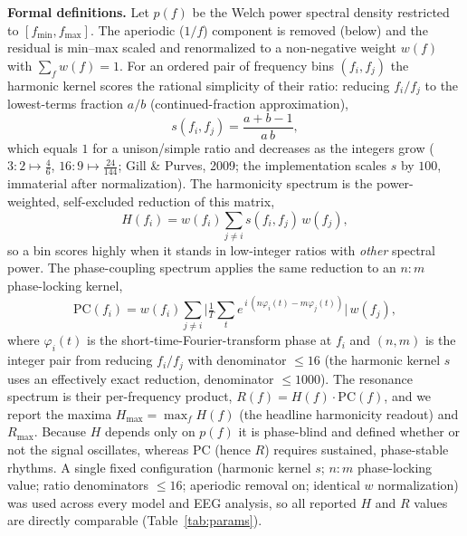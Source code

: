 \documentclass[11pt]{article}
\begin{document}
\textbf{Formal definitions.} Let $p(f)$ be the Welch power spectral density restricted to $[f_{\min},f_{\max}]$. The aperiodic ($1/f$) component is removed (below) and the residual is min--max scaled and renormalized to a non-negative weight $w(f)$ with $\sum_f w(f)=1$. For an ordered pair of frequency bins $(f_i,f_j)$ the harmonic kernel scores the rational simplicity of their ratio: reducing $f_i/f_j$ to the lowest-terms fraction $a/b$ (continued-fraction approximation), \[ s(f_i,f_j)=\frac{a+b-1}{a\,b}, \] which equals $1$ for a unison/simple ratio and decreases as the integers grow ($3{:}2\mapsto\tfrac{4}{6}$, $16{:}9\mapsto\tfrac{24}{144}$; Gill \& Purves, 2009; the implementation scales $s$ by $100$, immaterial after normalization). The harmonicity spectrum is the power-weighted, self-excluded reduction of this matrix, \[ H(f_i)=w(f_i)\sum_{j\neq i} s(f_i,f_j)\,w(f_j), \] so a bin scores highly when it stands in low-integer ratios with \emph{other} spectral power. The phase-coupling spectrum applies the same reduction to an $n{:}m$ phase-locking kernel, \[ \mathrm{PC}(f_i)=w(f_i)\sum_{j\neq i} \Big|\tfrac{1}{T}\sum_{t} e^{\,i\,(n\varphi_i(t)-m\varphi_j(t))}\Big|\,w(f_j), \] where $\varphi_i(t)$ is the short-time-Fourier-transform phase at $f_i$ and $(n,m)$ is the integer pair from reducing $f_i/f_j$ with denominator $\le 16$ (the harmonic kernel $s$ uses an effectively exact reduction, denominator $\le 1000$). The resonance spectrum is their per-frequency product, $R(f)=H(f)\cdot\mathrm{PC}(f)$, and we report the maxima $H_{\max}=\max_f H(f)$ (the headline harmonicity readout) and $R_{\max}$. Because $H$ depends only on $p(f)$ it is phase-blind and defined whether or not the signal oscillates, whereas $\mathrm{PC}$ (hence $R$) requires sustained, phase-stable rhythms. A single fixed configuration (harmonic kernel $s$; $n{:}m$ phase-locking value; ratio denominators $\le 16$; aperiodic removal on; identical $w$ normalization) was used across every model and EEG analysis, so all reported $H$ and $R$ values are directly comparable (Table~\ref{tab:params}).
\end{document}
